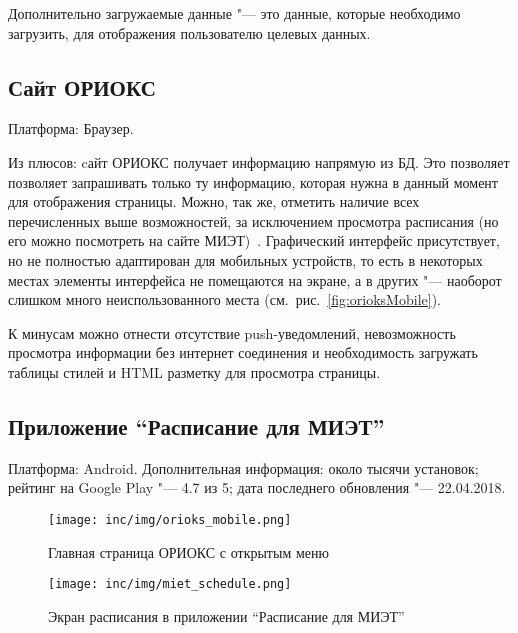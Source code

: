 Дополнительно загружаемые данные "--- это данные, которые необходимо загрузить, для отображения пользователю целевых данных.


\subsection{Сайт ОРИОКС}
\label{subsec:orioks}

Платформа: Браузер.

Из плюсов: cайт ОРИОКС получает информацию напрямую из БД.
Это позволяет позволяет запрашивать только ту информацию, которая нужна в данный момент для отображения страницы.
Можно, так же, отметить наличие всех перечисленных выше возможностей, за исключением просмотра расписания (но его можно посмотреть на сайте МИЭТ)~\cite{orioks}.
Графический интерфейс присутствует, но не полностью адаптирован для мобильных устройств, то есть в некоторых местах элементы интерфейса не помещаются на экране, а в других "--- наоборот слишком много неиспользованного места (см.~рис.~\ref{fig:orioksMobile}).

К минусам можно отнести отсутствие push-уведомлений, невозможность просмотра информации без интернет соединения и необходимость загружать таблицы стилей и HTML разметку для просмотра страницы.

\subsection{Приложение ``Расписание для МИЭТ''}
\label{subsec:appMietSchedule}
Платформа: Android.
Дополнительная информация: около тысячи установок;
рейтинг на Google Play "--- 4.7 из 5;
дата последнего обновления "--- 22.04.2018.

\begin{figure}[ht]
    \texttt{[image: inc/img/orioks\_mobile.png]}
    \caption{Главная страница ОРИОКС с открытым меню}
    \label{fig:orioksMobile}
  \endminipage\hfill
    \texttt{[image: inc/img/miet\_schedule.png]}
    \caption{Экран расписания в приложении ``Расписание для МИЭТ''}
    \label{fig:mietSchedule}
  \endminipage
\end{figure}

